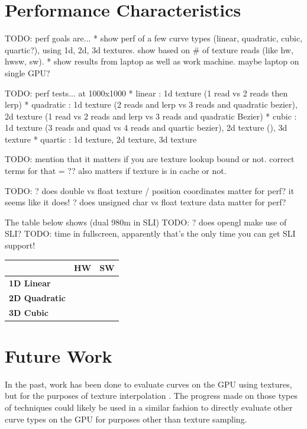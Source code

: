 \documentclass{jcgt}
\begin{document}
\section{Performance Characteristics}
\label{sec:performancecharacteristics}

TODO: perf goals are...
* show perf of a few curve types (linear, quadratic, cubic, quartic?), using 1d, 2d, 3d textures.  show based on \# of texture reads (like hw, hwsw, sw).
* show results from laptop as well as work machine. maybe laptop on single GPU?

TODO: perf tests... at 1000x1000
* linear    :  1d texture (1 read vs 2 reads then lerp)
* quadratic :  1d texture (2 reads and lerp vs 3 reads and quadratic bezier), 2d texture (1 read vs 2 reads and lerp vs 3 reads and quadratic Bezier)
* cubic     :  1d texture (3 reads and quad vs 4 reads and quartic bezier), 2d texture (), 3d texture 
* quartic   :  1d texture, 2d texture, 3d texture

TODO: mention that it matters if you are texture lookup bound or not.  correct terms for that = ?? also matters if texture is in cache or not.

TODO:
 ? does double vs float texture / position coordinates matter for perf? it seems like it does!
 ? does unsigned char vs float texture data matter for perf?

The table below shows  (dual 980m in SLI)
TODO: ? does opengl make use of SLI?
TODO: time in fullscreen, apparently that's the only time you can get SLI support!

\begin{tabular}{|l|l|l|}
\hline
& \bf{HW} & \bf{SW}\\ \hline
\bf{1D Linear} & &\\ \hline
\bf{2D Quadratic} & &\\ \hline
\bf{3D Cubic} & &\\ \hline
\end{tabular}

\section*{Future Work}
\label{sec:futurework}

In the past, work has been done to evaluate curves on the GPU using textures, but for the purposes of texture interpolation \cite{doi:10.1080/2151237X.2008.10129269}.  The progress made on those types of techniques could likely be used in a similar fashion to directly evaluate other curve types on the GPU for purposes other than texture sampling.
\end{document}
